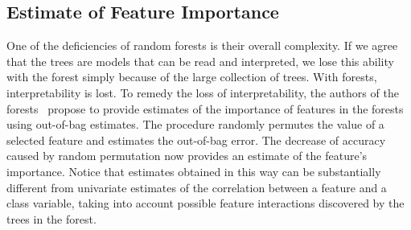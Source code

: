 \begin{refsection}
\subsection*{Estimate of Feature Importance}

One of the deficiencies of random forests is their overall complexity. If we agree that the trees are models that can be read and interpreted, we lose this ability with the forest simply because of the large collection of trees. With forests, interpretability is lost. To remedy the loss of interpretability, the authors of the forests~\cite{Brieman2001} propose to provide estimates of the importance of features in the forests using out-of-bag estimates. The procedure randomly permutes the value of a selected feature and estimates the out-of-bag error. The decrease of accuracy caused by random permutation now provides an estimate of the feature's importance. Notice that estimates obtained in this way can be substantially different from univariate estimates of the correlation between a feature and a class variable, taking into account possible feature interactions discovered by the trees in the forest.


\printbibliography[heading=subbibliography]
\end{refsection}